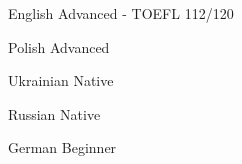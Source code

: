 

\begin{cvskills}

  \cvskill
    {English} %
    {Advanced - TOEFL 112/120} %

  \cvskill
    {Polish} %
    {Advanced} %

  \cvskill
    {Ukrainian} %
    {Native} %

  \cvskill
    {Russian} %
    {Native} %

  \cvskill
    {German} %
    {Beginner} %

\end{cvskills}
